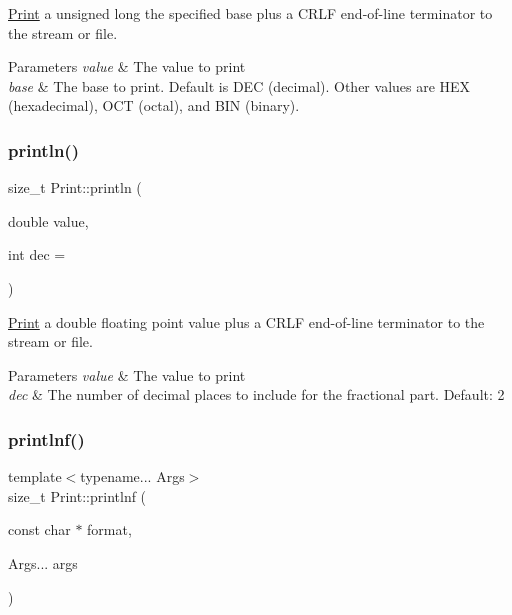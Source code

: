 \mbox{\hyperlink{class_print}{Print}} a unsigned long the specified base plus a C\+R\+LF end-\/of-\/line terminator to the stream or file. 


\begin{DoxyParams}{Parameters}
{\em value} & The value to print \\
\hline
{\em base} & The base to print. Default is D\+EC (decimal). Other values are H\+EX (hexadecimal), O\+CT (octal), and B\+IN (binary). \\
\hline
\end{DoxyParams}
\mbox{\label{class_print_a178b90baf9f74f0945f5c64aafec59ea}} 
\subsubsection{\texorpdfstring{println()}{println()}\hspace{0.1cm}{\footnotesize\ttfamily [6/6]}}
{\footnotesize\ttfamily size\+\_\+t Print\+::println (\begin{DoxyParamCaption}\item[{double}]{value,  }\item[{int}]{dec = {} }\end{DoxyParamCaption})}



\mbox{\hyperlink{class_print}{Print}} a double floating point value plus a C\+R\+LF end-\/of-\/line terminator to the stream or file. 


\begin{DoxyParams}{Parameters}
{\em value} & The value to print \\
\hline
{\em dec} & The number of decimal places to include for the fractional part. Default\+: 2 \\
\hline
\end{DoxyParams}
\mbox{\label{class_print_afa41aa5211c54b7b4d79b9286880c337}} 
\subsubsection{\texorpdfstring{printlnf()}{printlnf()}}
{\footnotesize\ttfamily template$<$typename... Args$>$ \\
size\+\_\+t Print\+::printlnf (\begin{DoxyParamCaption}\item[{const char $\ast$}]{format,  }\item[{Args...}]{args }\end{DoxyParamCaption})\hspace{0.3cm}{\ttfamily [inline]}}



